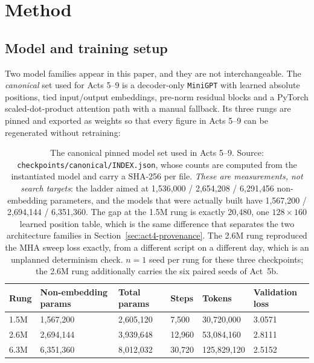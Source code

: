 \documentclass[11pt,a4paper]{article}
\begin{document}
\section{Method}
\label{sec:method}

\subsection{Model and training setup}
\label{sec:method-model}

Two model families appear in this paper, and they are not interchangeable. The
\emph{canonical} set used for Acts 5--9 is a decoder-only \texttt{MiniGPT} with
learned absolute positions, tied input/output embeddings, pre-norm residual
blocks and a PyTorch scaled-dot-product attention path with a manual fallback.
Its three rungs are pinned and exported as weights so that every figure in
Acts 5--9 can be regenerated without retraining:

\begin{table}[H]
\centering
\begin{tabular}{L{2.0cm}R{2.7cm}R{2.7cm}R{1.7cm}R{2.3cm}R{2.0cm}}
\toprule
Rung & Non-embedding params & Total params & Steps & Tokens & Validation loss \\
\midrule
1.5M & 1,567,200 & 2,605,120 & 7,500 & 30,720,000 & 3.0571 \\
2.6M & 2,694,144 & 3,939,648 & 12,960 & 53,084,160 & 2.8111 \\
6.3M & 6,351,360 & 8,012,032 & 30,720 & 125,829,120 & 2.5152 \\
\bottomrule
\end{tabular}
\caption{The canonical pinned model set used in Acts 5--9. Source:
\texttt{checkpoints/canonical/INDEX.json}, whose counts are computed from the
instantiated model and carry a SHA-256 per file. \emph{These are measurements,
not search targets}: the ladder aimed at 1,536,000 / 2,654,208 / 6,291,456
non-embedding parameters, and the models that were actually built have
1,567,200 / 2,694,144 / 6,351,360. The gap at the 1.5M rung is exactly
20,480, one $128\times160$ learned position table, which is the same
difference that separates the two architecture families in Section~\ref{sec:act4-provenance}.
The 2.6M rung reproduced the MHA sweep loss exactly, from a different script on
a different day, which is an unplanned determinism check. $n=1$ seed per rung
for these three checkpoints; the 2.6M rung additionally carries the six paired
seeds of Act~5b.}
\label{tab:canonical}
\end{table}
\end{document}
